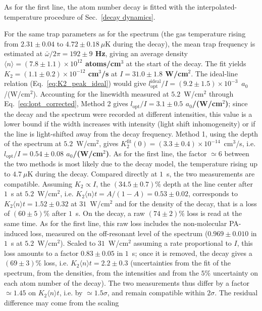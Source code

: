 As for the first line, the atom number decay is fitted with the interpolated-temperature
procedure of Sec.~\ref{decay dynamics}.

For the same trap parameters as for the spectrum (the gas
temperature rising from $2.31\pm0.04$ to $4.72\pm0.18~\mu$K during the decay), the mean trap frequency is
estimated at
\textbf{$\bar\omega/2\pi = 192\pm9$ Hz}, giving an average density
\textbf{$\langle n\rangle = (7.8\pm1.1)\times10^{12}$ atoms/cm$^3$} at the start of the decay.
The fit yields \textbf{$K_2 = (1.1\pm0.2)\times10^{-12}$ cm$^3$/s} at
\textbf{$I=31.0\pm1.8$ W/cm$^2$}. The ideal-line relation (Eq.~\ref{eq:K2_peak_ideal}) would
give $l_{\text{opt}}^{\text{ideal}}/I=(9.2\pm1.5)\times10^{-3}$~$a_0$/(W/cm$^2$).
Accounting for the linewidth measured at $5.2$~W/cm$^2$ through
Eq.~\ref{eq:lopt_corrected}, Method 2 gives
\textbf{$l_{\text{opt}}/I=3.1\pm0.5$ $a_0$/(W/cm$^2$)}; since the decay and the
spectrum were recorded at different intensities, this value is a lower bound if the
width increases with intensity (light shift inhomogeneity) or if the line is
light-shifted away from the decay frequency. Method 1, using the depth of the
spectrum at $5.2$~W/cm$^2$, gives $K_2^{\text{fit}}(0) = (3.3\pm0.4)\times10^{-14}$~cm$^3$/s,
i.e. \textbf{$l_{\text{opt}}/I=0.54\pm0.08$ $a_0$/(W/cm$^2$)}. As for the first line, the
factor $\simeq6$ between the two methods is most likely due to the decay model, the
temperature rising up to $4.7~\mu$K during the decay.
Compared directly at $1$~s, the two measurements are compatible.
Assuming $K_2\propto I$, the $(34.5\pm0.7)\%$ depth at the line center after $1$~s at
$5.2$~W/cm$^2$, i.e. $K_2\langle n\rangle t=A/(1-A)=0.53\pm0.02$, corresponds to
$K_2\langle n\rangle t=1.52\pm0.32$ at $31$~W/cm$^2$ and for the density of the decay, that
is a loss of $(60\pm5)\%$ after $1$~s. On the decay, a raw $(74\pm2)\%$ loss is read at the
same time. As for the first line, this raw loss includes the non-molecular PA-induced
loss, measured on the off-resonant level of the spectrum ($0.969\pm0.010$ in $1$~s at
$5.2$~W/cm$^2$). Scaled to $31$~W/cm$^2$ assuming a rate proportional to $I$, this loss
amounts to a factor $0.83\pm0.05$ in $1$~s; once it is removed, the decay gives a
$(69\pm3)\%$ loss, i.e. $K_2\langle n\rangle t=2.2\pm0.3$ (uncertainties from the fit of the
spectrum, from the densities, from the intensities and from the $5\%$ uncertainty on each
atom number of the decay). The two measurements thus
differ by a factor $\simeq1.45$ on $K_2\langle n\rangle t$, i.e. by $\simeq1.5\sigma$, and
remain compatible within $2\sigma$. The residual difference may come from the scaling
